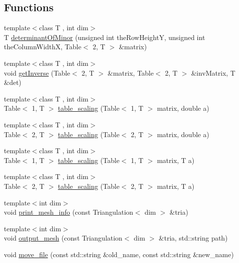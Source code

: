 \subsection*{Functions}
\begin{DoxyCompactItemize}
\item 
{\footnotesize template$<$class T , int dim$>$ }\\T \mbox{\hyperlink{supplementary_functions_8h_a95bed1847eed9d7f9da90da4aa8fe7c1}{determinant\+Of\+Minor}} (unsigned int the\+Row\+HeightY, unsigned int the\+Column\+WidthX, Table$<$ 2, T $>$ \&matrix)
\item 
{\footnotesize template$<$class T , int dim$>$ }\\void \mbox{\hyperlink{supplementary_functions_8h_ade5a79ed03042894cbe451fc7e1ccdf1}{get\+Inverse}} (Table$<$ 2, T $>$ \&matrix, Table$<$ 2, T $>$ \&inv\+Matrix, T \&det)
\item 
{\footnotesize template$<$class T , int dim$>$ }\\Table$<$ 1, T $>$ \mbox{\hyperlink{supplementary_functions_8h_ab98a2b7c384c7057fc9fca4a37350c63}{table\+\_\+scaling}} (Table$<$ 1, T $>$ matrix, double a)
\item 
{\footnotesize template$<$class T , int dim$>$ }\\Table$<$ 2, T $>$ \mbox{\hyperlink{supplementary_functions_8h_a6426196fb732830b7cae464a93ee2b15}{table\+\_\+scaling}} (Table$<$ 2, T $>$ matrix, double a)
\item 
{\footnotesize template$<$class T , int dim$>$ }\\Table$<$ 1, T $>$ \mbox{\hyperlink{supplementary_functions_8h_a5cd1e11e92aa6488e65b7ee7ef8acfb4}{table\+\_\+scaling}} (Table$<$ 1, T $>$ matrix, T a)
\item 
{\footnotesize template$<$class T , int dim$>$ }\\Table$<$ 2, T $>$ \mbox{\hyperlink{supplementary_functions_8h_a33371416e7cbc73fd7af9a9df5c7c2f7}{table\+\_\+scaling}} (Table$<$ 2, T $>$ matrix, T a)
\item 
{\footnotesize template$<$int dim$>$ }\\void \mbox{\hyperlink{group___supplementary_ga2971a293263dddc17f3df81add2ffbbe}{print\+\_\+mesh\+\_\+info}} (const Triangulation$<$ dim $>$ \&tria)
\item 
{\footnotesize template$<$int dim$>$ }\\void \mbox{\hyperlink{group___supplementary_ga0272b346b175b931e89b017fd93b5b80}{output\+\_\+mesh}} (const Triangulation$<$ dim $>$ \&tria, std\+::string path)
\item 
void \mbox{\hyperlink{group___supplementary_gae0eb2d2afc3e33a9bb3b409b0171c470}{move\+\_\+file}} (const std\+::string \&old\+\_\+name, const std\+::string \&new\+\_\+name)
\end{DoxyCompactItemize}


